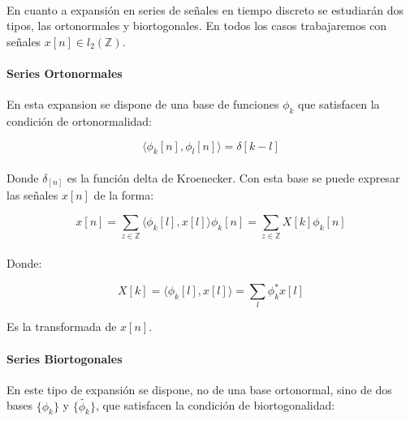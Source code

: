 \paragraph{}
En cuanto a expansión en series de señales en tiempo discreto se estudiarán dos tipos, las ortonormales y biortogonales. En todos los casos trabajaremos con señales $x[n] \in l_{2}(\mathbb{Z})$.


\paragraph{Series Ortonormales}
En esta expansion se dispone de una base de funciones $\phi_k$ que satisfacen la condición de ortonormalidad:

\begin{equation}
	\langle \phi_k[n] , \phi_l[n] \rangle = \delta[k - l]
\end{equation}

\paragraph{}
Donde $\delta_[n]$ es la función delta de Kroenecker. Con esta base se puede expresar las señales $x[n]$ de la forma:

\begin{equation}
	x[n] = \sum_{z \in \mathbb{Z}} \langle \phi_k[l] , x[l] \rangle \phi_{k}[n] = \sum_{z \in \mathbb{Z}} X[k] \phi_{k}[n]
\end{equation}

\paragraph{}
Donde:

\begin{equation}
	X[k] = \langle \phi_k[l] , x[l] \rangle = \sum_{l} \phi_{k}^{*} x[l]
\end{equation}

Es la transformada de $x[n]$.


\paragraph{Series Biortogonales}
En este tipo de expansión se dispone, no de una base ortonormal, sino de dos bases $\{ \phi_{k} \}$ y $\{ \tilde{\phi_{k}} \}$, que satisfacen la condición de biortogonalidad:

